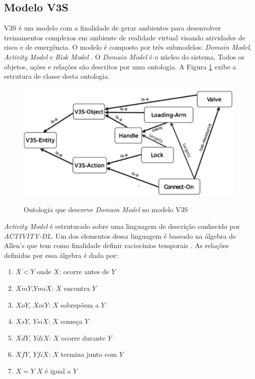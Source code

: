 \subsection{Modelo V3S}\label{v3smodel}

V3S é um modelo com a finalidade de gerar ambientes para desenvolver treinamentos complexos em ambiente de realidade virtual visando atividades de risco e de emergência. O modelo é composto por três submodelos: \textit{Domain Model}, \textit{Activity Model} e \textit{Risk Model} \cite{v3sframework}. O \textit{Domain Model} é o núcleo do sistema. Todos os objetos, ações e relações são descritos por uma ontologia. 
A Figura \ref{domainmodel} exibe a estrutura de classe desta ontologia.

\begin{figure}[H]
  \centering
    \caption{Ontologia que descreve \textit{Domain Model} no modelo V3S }
  \includegraphics[width=0.5\linewidth]{figure/ontologyv3.png} 
  \begin{center}
  \cite{v3sframework}
  \end{center}
  \label{domainmodel}
\end{figure}

\textit{Activity Model} é estruturado sobre uma linguagem de descrição conhecido por \textit{ACTIVITY-DL}. Um dos elementos dessa linguagem é baseado na álgebra de Allen's que tem como finalidade definir raciocínios temporais \cite{allenalgebric}. As relações definidas por essa álgebra é dada por:

\begin{enumerate}
	\item $X < Y$ onde $X$: ocorre antes de $Y$ 
	\item $X m Y$,$Y mi X$: $X$ encontra $Y$
	\item $X o Y$, $X oi Y$: $X$ sobrepõem a $Y$
	\item $X s Y$, $Y si X$: $X$ começa $Y$
	\item $X d Y$, $Y di X$: $X$ ocorre durante $Y$	  
	\item $X f Y$, $Y fi X$: $X$ termina junto com $Y$	  	
	\item $X = Y$ $X$ é igual a $Y$	  		
\end{enumerate}

